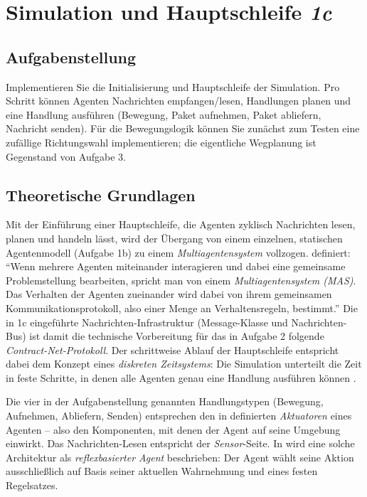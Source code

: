 
\section{Simulation und Hauptschleife \textit{1c}}
\label{sec:aufgabe1c}

\subsection{Aufgabenstellung}

Implementieren Sie die Initialisierung und Hauptschleife der Simulation. Pro Schritt können Agenten Nachrichten empfangen/lesen, Handlungen planen und eine Handlung ausführen (Bewegung, Paket aufnehmen, Paket abliefern, Nachricht senden). Für die Bewegungslogik können Sie zunächst zum Testen eine zufällige Richtungswahl implementieren; die eigentliche Wegplanung ist Gegenstand von Aufgabe 3.

\subsection{Theoretische Grundlagen}

Mit der Einführung einer Hauptschleife, die Agenten zyklisch Nachrichten lesen, planen und handeln lässt, wird der Übergang von einem einzelnen, statischen Agentenmodell (Aufgabe 1b) zu einem \textit{Multiagentensystem} vollzogen. \textcite[S. 29\,f.]{5} definiert: \enquote{Wenn mehrere Agenten miteinander interagieren und dabei eine gemeinsame Problemstellung bearbeiten, spricht man von einem \textit{Multiagentensystem (MAS)}. Das Verhalten der Agenten zueinander wird dabei von ihrem gemeinsamen Kommunikationsprotokoll, also einer Menge an Verhaltensregeln, bestimmt.} Die in 1c eingeführte Nachrichten-Infrastruktur (Message-Klasse und Nachrichten-Bus) ist damit die technische Vorbereitung für das in Aufgabe 2 folgende \textit{Contract-Net-Protokoll}. Der schrittweise Ablauf der Hauptschleife entspricht dabei dem Konzept eines \textit{diskreten Zeitsystems}: Die Simulation unterteilt die Zeit in feste Schritte, in denen alle Agenten genau eine Handlung ausführen können \cite[S. 13]{5}.

Die vier in der Aufgabenstellung genannten Handlungstypen (Bewegung, Aufnehmen, Abliefern, Senden) entsprechen den in \textcite[S. 8]{5} definierten \textit{Aktuatoren} eines Agenten -- also den Komponenten, mit denen der Agent auf seine Umgebung einwirkt. Das Nachrichten-Lesen entspricht der \textit{Sensor}-Seite. In \textcite[S. 14\,ff.]{5} wird eine solche Architektur als \textit{reflexbasierter Agent} beschrieben: Der Agent wählt seine Aktion ausschließlich auf Basis seiner aktuellen Wahrnehmung und eines festen Regelsatzes.

